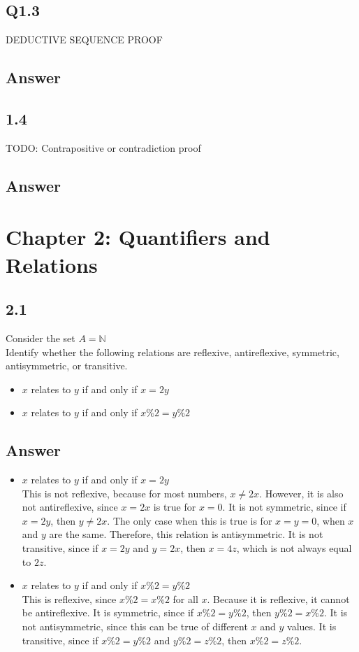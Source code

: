 \documentclass{article}
\begin{document}
\subsection*{Q1.3}
DEDUCTIVE SEQUENCE PROOF
\subsection*{Answer}
\newpage
\subsection*{1.4}
TODO: Contrapositive or contradiction proof
\subsection*{Answer}
\newpage
\section*{Chapter 2: Quantifiers and Relations}
\subsection*{2.1}
Consider the set $A=\mathbb{N}$
\\ Identify whether the following relations are reflexive, antireflexive, symmetric, antisymmetric, or transitive.
\begin{itemize}
    \item $x$ relates to $y$ if and only if $x=2y$ 
    \item $x$ relates to $y$ if and only if $x\%2=y\%2$
\end{itemize}
\newpage
\subsection*{Answer}
\begin{itemize}
    \item $x$ relates to $y$ if and only if $x=2y$
    \\ This is not reflexive, because for most numbers, $x\neq 2x$. However, it is also not antireflexive, since $x=2x$ is true for $x=0$. It is not symmetric, since if $x=2y$, then $y\neq2x$. The only case when this is true is for $x=y=0$, when $x$ and $y$ are the same. Therefore, this relation is antisymmetric. It is not transitive, since if $x=2y$ and $y=2x$, then $x=4z$, which is not always equal to $2z$.
    \item $x$ relates to $y$ if and only if $x\%2=y\%2$
    \\ This is reflexive, since $x\%2=x\%2$ for all $x$. Because it is reflexive, it cannot be antireflexive. It is symmetric, since if $x\%2=y\%2$, then   $y\%2=x\%2$. It is not antisymmetric, since this can be true of different $x$ and $y$ values. It is transitive, since if $x\%2=y\%2$ and $y\%2=z\%2$, then $x\%2=z\%2$.
\end{itemize}
\newpage
\end{document}
